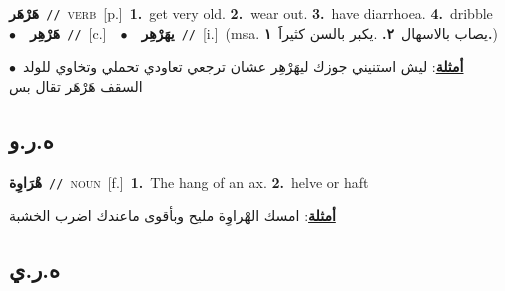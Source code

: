 \documentclass[10pt,a4paper,twoside]{article} %
\begin{document}
\begin{multicols}{2}
{\setlength\topsep{0pt}\textbf{\foreignlanguage{arabic}{هَرْهَر}}\ {\color{gray}\texttt{//}\color{black}}\ \textsc{verb}\ [p.]\ \textbf{1.}~get very old.  \textbf{2.}~wear out.  \textbf{3.}~have diarrhoea.  \textbf{4.}~dribble\ \ $\bullet$\ \ \setlength\topsep{0pt}\textbf{\foreignlanguage{arabic}{هَرْهِر}}\ {\color{gray}\texttt{//}\color{black}}\ [c.]\ \ $\bullet$\ \ \setlength\topsep{0pt}\textbf{\foreignlanguage{arabic}{يهَرْهِر}}\ {\color{gray}\texttt{//}\color{black}}\ [i.]\ \color{gray}(msa. \foreignlanguage{arabic}{يصاب بالاسهال}~\foreignlanguage{arabic}{\textbf{٢.}}  .\foreignlanguage{arabic}{يكبر بالسن كثيراََ}~\foreignlanguage{arabic}{\textbf{١.}})\color{black}\  \begin{flushright}\color{gray}\foreignlanguage{arabic}{\textbf{\underline{\foreignlanguage{arabic}{أمثلة}}}: ليش استنيني جوزك ليهَرْهِر عشان ترجعي تعاودي تحملي وتخاوي للولد\ $\bullet$\ \  السقف هَرْهَر تقال بس}\end{flushright}\color{black}} \vspace{2mm}

\vspace{-3mm}
\subsection*{\color{blue}\foreignlanguage{arabic}{ه.ر.و}\color{blue}{}} 

{\setlength\topsep{0pt}\textbf{\foreignlanguage{arabic}{هْرَاوِة}}\ {\color{gray}\texttt{//}\color{black}}\ \textsc{noun}\ [f.]\ \textbf{1.}~The hang of an ax.  \textbf{2.}~helve or haft\  \begin{flushright}\color{gray}\foreignlanguage{arabic}{\textbf{\underline{\foreignlanguage{arabic}{أمثلة}}}: امسك الهْراوِة مليح وبأقوى ماعندك اضرب الخشبة}\end{flushright}\color{black}} \vspace{2mm}

\vspace{-3mm}
\subsection*{\color{blue}\foreignlanguage{arabic}{ه.ر.ي}\color{blue}{}} 


\end{multicols}
\end{document}
